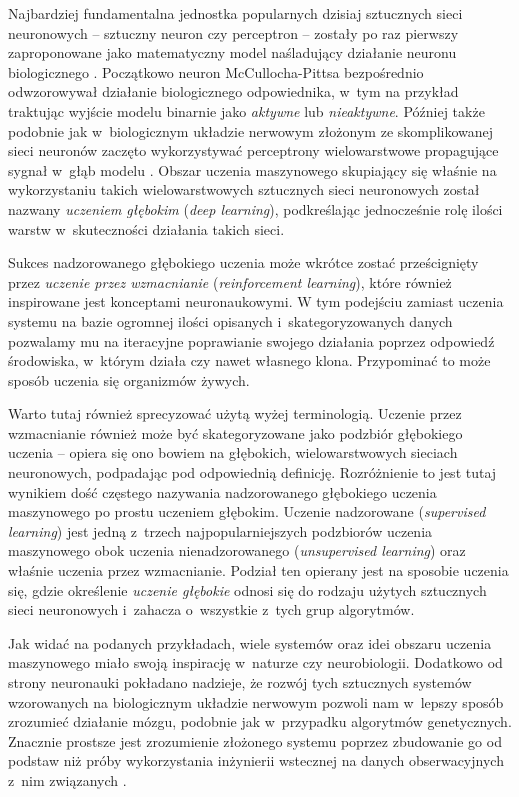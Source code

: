 Najbardziej fundamentalna jednostka popularnych dzisiaj sztucznych sieci neuronowych -- sztuczny neuron czy perceptron -- zostały po raz pierwszy zaproponowane jako matematyczny model naśladujący działanie neuronu biologicznego \cite{mcculloch1943logical}.
Początkowo neuron McCullocha-Pittsa bezpośrednio odwzorowywał działanie biologicznego odpowiednika, w~tym na przykład traktując wyjście modelu binarnie jako \emph{aktywne} lub \emph{nieaktywne}.
Później także podobnie jak w~biologicznym układzie nerwowym złożonym ze skomplikowanej sieci neuronów zaczęto wykorzystywać perceptrony wielowarstwowe propagujące sygnał w~głąb modelu \cite{rosenblatt1961principles}.
Obszar uczenia maszynowego skupiający się właśnie na wykorzystaniu takich wielowarstwowych sztucznych sieci neuronowych został nazwany \emph{uczeniem głębokim} (\emph{deep learning}), podkreślając jednocześnie rolę ilości warstw w~skuteczności działania takich sieci.

Sukces nadzorowanego głębokiego uczenia może wkrótce zostać prześcignięty przez \emph{uczenie przez wzmacnianie} (\emph{reinforcement learning}), które również inspirowane jest konceptami neuronaukowymi.
W tym podejściu zamiast uczenia systemu na bazie ogromnej ilości opisanych i~skategoryzowanych danych pozwalamy mu na iteracyjne poprawianie swojego działania poprzez odpowiedź środowiska, w~którym działa czy nawet własnego klona.
Przypominać to może sposób uczenia się organizmów żywych.

Warto tutaj również sprecyzować użytą wyżej terminologią.
Uczenie przez wzmacnianie również może być skategoryzowane jako podzbiór głębokiego uczenia -- opiera się ono bowiem na głębokich, wielowarstwowych sieciach neuronowych, podpadając pod odpowiednią definicję.
Rozróżnienie to jest tutaj wynikiem dość częstego nazywania nadzorowanego głębokiego uczenia maszynowego po prostu uczeniem głębokim.
Uczenie nadzorowane (\emph{supervised learning}) jest jedną z~trzech najpopularniejszych podzbiorów uczenia maszynowego obok uczenia nienadzorowanego (\emph{unsupervised learning}) oraz właśnie uczenia przez wzmacnianie.
Podział ten opierany jest na sposobie uczenia się, gdzie określenie \emph{uczenie głębokie} odnosi się do rodzaju użytych sztucznych sieci neuronowych i~zahacza o~wszystkie z~tych grup algorytmów.

Jak widać na podanych przykładach, wiele systemów oraz idei obszaru uczenia maszynowego miało swoją inspirację w~naturze czy neurobiologii.
Dodatkowo od strony neuronauki pokładano nadzieje, że rozwój tych sztucznych systemów wzorowanych na biologicznym układzie nerwowym pozwoli nam w~lepszy sposób zrozumieć działanie mózgu, podobnie jak w~przypadku algorytmów genetycznych.
Znacznie prostsze jest zrozumienie złożonego systemu poprzez zbudowanie go od podstaw niż próby wykorzystania inżynierii wstecznej na danych obserwacyjnych z~nim związanych \cite{braitenberg1986vehicles}.

